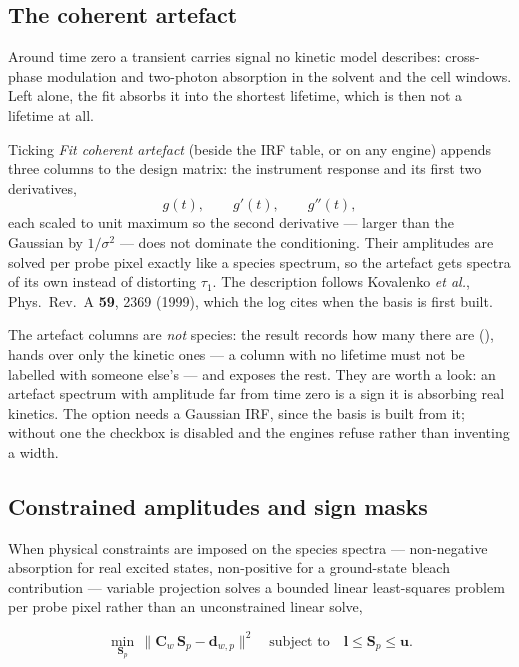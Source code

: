 \subsection{The coherent artefact}\label{sec:artefact}

Around time zero a transient carries signal no kinetic model describes:
cross-phase modulation and two-photon absorption in the solvent and the cell
windows. Left alone, the fit absorbs it into the shortest lifetime, which is
then not a lifetime at all.

Ticking \emph{Fit coherent artefact} (beside the IRF table, or
 on any engine) appends three columns to the
design matrix: the instrument response and its first two derivatives,
\[
  g(t),\qquad g'(t),\qquad g''(t),
\]
each scaled to unit maximum so the second derivative --- larger than the
Gaussian by $1/\sigma^{2}$ --- does not dominate the conditioning. Their
amplitudes are solved per probe pixel exactly like a species spectrum, so the
artefact gets spectra of its own instead of distorting $\tau_1$. The
description follows Kovalenko \emph{et al.}, Phys.\ Rev.\ A \textbf{59}, 2369
(1999), which the log cites when the basis is first built.

The artefact columns are \emph{not} species: the result records how many there
are (),  hands over only the kinetic
ones --- a column with no lifetime must not be labelled with someone else's ---
and  exposes the rest. They are worth a look: an
artefact spectrum with amplitude far from time zero is a sign it is absorbing
real kinetics. The option needs a Gaussian IRF, since the basis is built from
it; without one the checkbox is disabled and the engines refuse rather than
inventing a width.

\subsection{Constrained amplitudes and sign masks}

When physical constraints are imposed on the species spectra --- non-negative
absorption for real excited states, non-positive for a ground-state bleach
contribution --- variable projection solves a bounded linear least-squares
problem per probe pixel rather than an unconstrained linear solve,

\begin{equation}
  \min_{\mathbf{S}_p}\,
    \lVert \mathbf{C}_w\,\mathbf{S}_p - \mathbf{d}_{w,p}\rVert^2
  \quad\text{subject to}\quad
    \mathbf{l} \le \mathbf{S}_p \le \mathbf{u}.
\end{equation}

